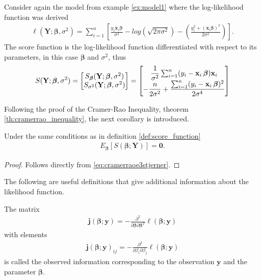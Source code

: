 \begin{example}
Consider again the model from example \ref{ex:model1} where the log-likelihood function was derived
\begin{align*}
   \ell(\textbf{Y};\boldsymbol{\beta}, \sigma^2) = \sum_{i = 1}^n \left[\frac{y_i \textbf{x}_i\boldsymbol{\beta}}{\sigma^2} - log\left( \sqrt{2 \pi \sigma^2}\right) - \left( \frac{y_i^2 + (\textbf{x}_i\boldsymbol{\beta})^2}{2\sigma^2} \right) \right].
\end{align*}
The score function is the log-likelihood function differentiated with respect to its parameters, in this case $\boldsymbol{\beta}$ and $\sigma^2$, thus
\begin{align*}
    S(\textbf{Y}; \operatorname{\boldsymbol{\beta}}, \sigma^2) = 
    \begin{bmatrix}
        S_{\operatorname{\boldsymbol{\beta}}} (\textbf{Y}; \operatorname{\boldsymbol{\beta}}, \sigma^2) \\
        S_{\sigma^2}(\textbf{Y}; \operatorname{\boldsymbol{\beta}}, \sigma^2)
    \end{bmatrix}
    =
    \begin{bmatrix}
        \dfrac{1}{\sigma^2} \sum_{i=1}^n (y_i - \textbf{x}_i \operatorname{\boldsymbol{\beta}}) \textbf{x}_i \\
        - \dfrac{n}{2 \sigma^2} + \dfrac{\sum_{i=1}^n (y_i - \textbf{x}_i \operatorname{\boldsymbol{\beta}})^2}{2 \sigma^4}
    \end{bmatrix}
\end{align*}
\end{example}
Following the proof of the Cramer-Rao Inequality, theorem \ref{th:cramerrao_inequality}, the next corollary is introduced.
\begin{corollary}
Under the same conditions as in definition \ref{def:score_function}
\begin{align} \label{eq:corollary}
    E_{\boldsymbol{\beta}}[S(\boldsymbol{\beta}; \textbf{Y})] = \textbf{0}.
\end{align}
\end{corollary}
\begin{proof}
Follows directly from \eqref{eq:cramerraoe3stjerner}.
\end{proof}
The following are useful definitions that give additional information about the likelihood function.
\begin{definition} 
\label{def:observed_information}
The matrix
\begin{align} \label{eq:Observed_information}
    \textbf{j}(\boldsymbol{\beta};\textbf{y}) = - \frac{\partial^2}{\partial \boldsymbol{\beta} \partial \boldsymbol{\beta}^T} \ell(\boldsymbol{\beta}; \textbf{y})
\end{align}
with elements
\begin{align*}
    \textbf{j}(\boldsymbol{\beta};\textbf{y})_{ij} = - \frac{\partial^2}{\partial \beta_i \partial \beta_j} \ell(\boldsymbol{\beta}; \textbf{y})
\end{align*}
is called the observed information corresponding to the observation $\textbf{y}$ and the parameter $\boldsymbol{\beta}$.
\end{definition}
